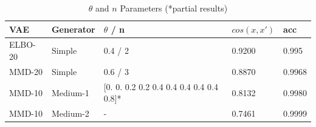 \documentclass{article}
\begin{document}
\begin{table}[h]
  \caption{$\theta$ and $n$ Parameters (*partial results)}
  \label{theta}
  \centering
  \begin{tabular}{lllll}
    \toprule
    VAE     & Generator     & $\theta$ / n & $cos(x,x')$ & acc \\
    \midrule
    ELBO-20 & Simple  & 0.4 / 2 & 0.9200 & 0.995 \\
    MMD-20 & Simple &  0.6 / 3  & 0.8870 & 0.9968 \\
    MMD-10 & Medium-1 & [0.  0.  0.2 0.2 0.4 0.4 0.4 0.4 0.4 0.8]* & 0.8132 & 0.9980 \\
    MMD-10 & Medium-2 & - & 0.7461 & 0.9999 \\
    \bottomrule
  \end{tabular}
\end{table}
\end{document}
